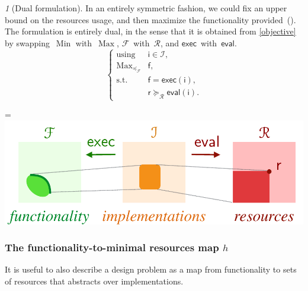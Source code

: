 \documentclass[twocolumn,english]{IEEEtran}
\theoremstyle{definition}
\theoremstyle{plain}
\theoremstyle{definition}
\theoremstyle{remark}
\newtheorem{rem}{\protect\remarkname}
\theoremstyle{definition}
\theoremstyle{plain}
\theoremstyle{plain}
\newcommand{\aword}[1]{\mathsf{#1}}
\newcommand{\vmath}[1]{\aword{#1}}
\newcommand{\subto}{\text{s.t.}}
\newcommand{\with}{\text{using}}
\DeclareMathOperator*{\Min}{Min}
\DeclareMathOperator*{\Max}{Max}
\newcommand{\posleq}{\preceq}
\newcommand{\posgeq}{\succeq}
\newcommand{\ftor}{{h}}
\newcommand{\funsp}{\mathscr{F}}
\newcommand{\funleq}{\posleq_{\funsp}}
\newcommand{\fun}{\vmath{f}}
\newcommand{\imp}{\vmath{i}}
\newcommand{\impsp}{\mathscr{I}}
\newcommand{\exc}{\vmath{exec}}
\newcommand{\eval}{\vmath{eval}}
\newcommand{\res}{\vmath{r}}
\newcommand{\ressp}{\mathscr{R}}
\newcommand*{\vcenteredhbox}[1]{\begingroup
\setbox0=\hbox{#1}\parbox{\wd0}{\box0}\endgroup}
\newcommand{\captionsideleft}[2]{
    \medskip
    \begin{minipage}{1.8cm}{
        \hfill
        \protect\captionof{figure}{#1}}\end{minipage}
    \begin{minipage}{6.6cm}
    
    \vcenteredhbox{{#2}}
    \hfill
    \end{minipage}
    \medskip
}
\providecommand{\remarkname}{Remark}
\begin{document}
\begin{rem}[Dual formulation]
In an entirely symmetric fashion, we could fix an upper bound on
the resources usage, and then maximize the functionality provided~().
The formulation is entirely dual, in the sense that it is obtained
from \eqref{objective} by swapping~$\Min$ with~$\Max$, $\funsp$~with~$\ressp$,
and $\exc$~with~$\eval$.
\begin{equation}
\begin{cases}
\with & \imp\in\impsp,\\
\Max_{\funleq} & \fun,\\
\subto & \fun=\exc(\imp),\\
 & \res\posgeq_{\ressp}\eval(\imp).
\end{cases}\label{eq:objective-1}
\end{equation}
\end{rem}
\captionsideleft{\label{fig:setup_max_f}}{\includegraphics[scale=0.33]{gmcdp_setup_query_r}}



\subsubsection{The functionality-to-minimal resources map $\ftor$}

It is useful to also describe a design problem as a map from functionality
to sets of resources that abstracts over implementations. 
\end{document}
